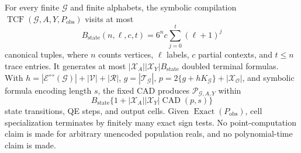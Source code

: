 For every finite \(\mathcal G\) and finite alphabets, the symbolic compilation \(\operatorname{TCF}(\mathcal G,A,Y,P_{\mathrm{obs}})\) visits at most \[B_{\mathrm{state}}(n,\ell,c,t)=6^n c\sum_{j=0}^{t}(\ell+1)^j\] canonical tuples, where \(n\) counts vertices, \(\ell\) labels, \(c\) partial contexts, and \(t\leq n\) trace entries. It generates at most \(|\mathcal X_A||\mathcal X_Y|B_{\mathrm{state}}\) doubled terminal formulas. With \(h=|\mathcal E^{\leftrightarrow}(\mathcal G)|+|\mathcal V|+|\mathcal R|\), \(g=|\mathcal T_{\mathcal G}|\), \(p=2\{g+hK_{\mathcal G}\}+|\mathcal X_{\mathcal O}|\), and symbolic formula encoding length \(s\), the fixed CAD produces \(\mathscr P_{\mathcal G,A,Y}\) within \[B_{\mathrm{state}}\{1+|\mathcal X_A||\mathcal X_Y|\operatorname{CAD}(p,s)\}\] state transitions, QE steps, and output cells. Given \(\operatorname{Exact}(P_{\mathrm{obs}})\), cell specialization terminates by finitely many exact sign tests. No point-computation claim is made for arbitrary unencoded population reals, and no polynomial-time claim is made.